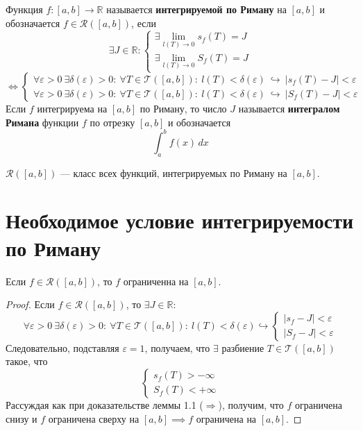 \documentclass[11pt]{article}
\begin{document}
\begin{definition}
    Функция $f \colon [a, b] \to \mathbb{R}$ называется \textbf{интегрируемой по Риману} на $[a, b]$ 
    и обозначается $f \in \mathcal{R}([a, b])$, если 
    \[\exists J \in \mathbb{R} : 
    \begin{cases}
        \exists \displaystyle \lim_{l(T) \to 0} s_f(T) = J \\
        \exists \displaystyle \lim_{l(T) \to 0} S_f(T) = J  
    \end{cases}\]
    \[\Longleftrightarrow 
    \begin{cases}
        \forall \varepsilon > 0 \ \exists \delta(\varepsilon) > 0: \ \forall T \in \mathcal{T}([a, b]): \ 
        l(T) < \delta(\varepsilon) \ \hookrightarrow \ \left\lvert s_f(T) - J \right\rvert < \varepsilon \\
        \forall \varepsilon > 0 \ \exists \delta(\varepsilon) > 0: \ \forall T \in \mathcal{T}([a, b]): \ 
        l(T) < \delta(\varepsilon) \ \hookrightarrow \ \left\lvert S_f(T) - J \right\rvert < \varepsilon
    \end{cases}\]
    Если $f$ интегрируема на $[a, b]$ по Риману, то число $J$ называется \textbf{интегралом Римана} функции $f$ по отрезку 
    $[a, b]$ и обозначается \[\int_{a}^{b} f(x)\,dx \]
\end{definition}

\begin{definition}
    $\mathcal{R}([a, b]) \text{ --- класс всех функций, 
    интегрируемых по Риману на } [a, b]$.
\end{definition}

\section{Необходимое условие интегрируемости по Риману}

\begin{theorem}
    Если $f \in \mathcal{R}([a, b])$, то $f$ ограниченна на $[a, b]$.
\end{theorem}

\begin{proof}
    Если $f \in \mathcal{R}([a, b])$, то $\exists J \in \mathbb{R}:$
    \[\forall \varepsilon > 0 \ \exists \delta(\varepsilon) > 0: \ \forall T 
    \in \mathcal{T}([a, b]): \ l(T) < \delta(\varepsilon) \hookrightarrow 
    \begin{cases}
        \left\lvert s_f - J \right\rvert < \varepsilon \\
        \left\lvert S_f - J \right\rvert < \varepsilon 
    \end{cases}\]
    Следовательно, подставляя $\varepsilon = 1$, получаем, что $\exists$ 
    разбиение $T \in \mathcal{T}([a, b])$ такое, что 
    \[\begin{cases}
        s_f(T) > - \infty \\
        S_f(T) < + \infty
    \end{cases}\]
    Рассуждая как при доказательстве леммы 1.1 ($\Longrightarrow$), получим, что 
    $f$ ограничена снизу и $f$ ограничена сверху на $[a, b] \implies f$ 
    ограничена на $[a, b]$.
\end{proof}
\end{document}
